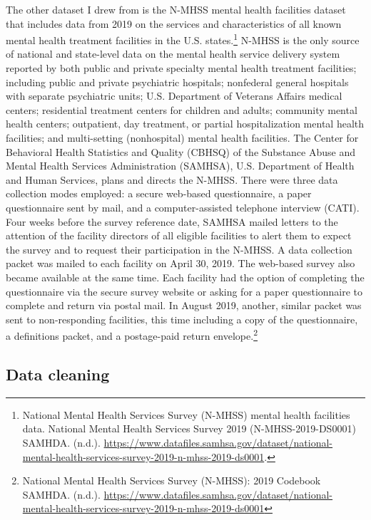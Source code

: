 \documentclass[
]{article}
\begin{document}
The other dataset I drew from is the N-MHSS mental health facilities dataset that includes data from 2019 on the services and characteristics of all known mental health treatment facilities in the U.S. states.\footnote{National Mental Health Services Survey (N-MHSS) mental health facilities data. National Mental Health Services Survey 2019 (N-MHSS-2019-DS0001) \textbar{} SAMHDA. (n.d.). \url{https://www.datafiles.samhsa.gov/dataset/national-mental-health-services-survey-2019-n-mhss-2019-ds0001}.} N-MHSS is the only source of national and state-level data on the mental health service delivery system reported by both public and private specialty mental health treatment facilities; including public and private psychiatric hospitals; nonfederal general hospitals with separate psychiatric units; U.S. Department of Veterans Affairs medical centers; residential treatment centers for children and adults; community mental health centers; outpatient, day treatment, or partial hospitalization mental health facilities; and multi-setting (nonhospital) mental health facilities. The Center for Behavioral Health Statistics and Quality (CBHSQ) of the Substance Abuse and Mental Health Services Administration (SAMHSA), U.S. Department of Health and Human Services, plans and directs the N-MHSS. There were three data collection modes employed: a secure web-based questionnaire, a paper questionnaire sent by mail, and a computer-assisted telephone interview (CATI). Four weeks before the survey reference date, SAMHSA mailed letters to the attention of the facility directors of all eligible facilities to alert them to expect the survey and to request their participation in the N-MHSS. A data collection packet was mailed to each facility on April 30, 2019. The web-based survey also became available at the same time. Each facility had the option of completing the questionnaire via the secure survey website or asking for a paper questionnaire to complete and return via postal mail. In August 2019, another, similar packet was sent to non-responding facilities, this time including a copy of the questionnaire, a definitions packet, and a postage-paid return envelope.\footnote{National Mental Health Services Survey (N-MHSS): 2019 Codebook \textbar{} SAMHDA. (n.d.). \url{https://www.datafiles.samhsa.gov/dataset/national-mental-health-services-survey-2019-n-mhss-2019-ds0001}}

\hypertarget{data-cleaning}{%
\subsection{Data cleaning}\label{data-cleaning}}
\end{document}
